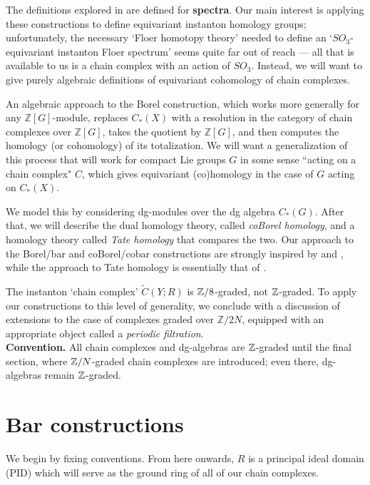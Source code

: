 \documentclass{memo-l}
\theoremstyle{definition}
\theoremstyle{remark}
\numberwithin{section}{chapter}
\numberwithin{equation}{chapter}
\begin{document}
The definitions explored in \cite{GreM} are defined for \textbf{spectra}. Our main interest is applying these constructions to define equivariant instanton homology groups; unfortunately, the necessary `Floer homotopy theory' needed to define an `$SO_3$-equivariant instanton Floer spectrum' seems quite far out of reach --- all that is available to us is a chain complex with an action of $SO_3$. Instead, we will want to give purely algebraic definitions of equivariant cohomology of chain complexes.

An algebraic approach to the Borel construction, which works more generally for any $\mathbb Z[G]$-module, replaces $C_*(X)$ with a resolution in the category of chain complexes over $\mathbb Z[G]$, takes the quotient by $\mathbb Z[G]$, and then computes the homology (or cohomology) of its totalization. We will want a generalization of this process that will work for compact Lie groups $G$ in some sense ``acting on a chain complex" $C$, which gives equivariant (co)homology in the case of $G$ acting on $C_*(X)$. 

We model this by considering dg-modules over the dg algebra $C_*(G)$. After that, we will describe the dual homology theory, called \textit{coBorel homology}, and a homology theory called \textit{Tate homology} that compares the two. Our approach to the Borel/bar and coBorel/cobar constructions are strongly inspired by \cite{GM} and \cite{barthel2014six}, while the approach to Tate homology is essentially that of \cite{Klein}. 

The instanton `chain complex' $\widetilde C(Y; R)$ is $\Bbb Z/8$-graded, not $\Bbb Z$-graded. To apply our constructions to this level of generality, we conclude with a discussion of extensions to the case of complexes graded over $\mathbb Z/2N$, equipped with an appropriate object called a \emph{periodic filtration}.\\

\noindent \textbf{Convention.} All chain complexes and dg-algebras are $\Bbb Z$-graded until the final section, where $\Bbb Z/N$-graded chain complexes are introduced; even there, dg-algebras remain $\Bbb Z$-graded.

\section{Bar constructions}
We begin by fixing conventions. From here onwards, $R$ is a principal ideal domain (PID) which will serve as the ground ring of all of our chain complexes.
\end{document}

